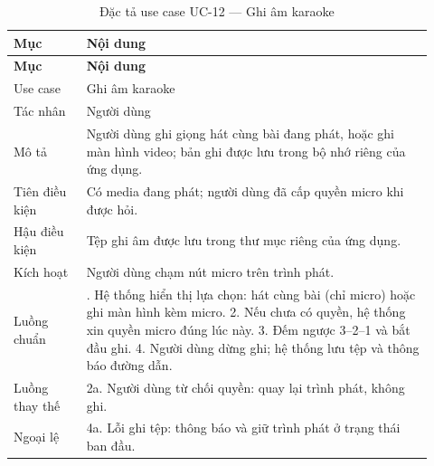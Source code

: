 \begingroup\small\renewcommand{\arraystretch}{1.15}\setlength{\tabcolsep}{3pt}
\begin{longtable}{>{\RaggedRight\arraybackslash}p{0.16\linewidth}>{\RaggedRight\arraybackslash}p{0.76\linewidth}}
\caption{Đặc tả use case UC-12 --- Ghi âm karaoke}
\label{tab:spec-uc-12}\\
\toprule
\textbf{Mục} & \textbf{Nội dung} \\
\midrule
\endfirsthead
\toprule
\textbf{Mục} & \textbf{Nội dung} \\
\midrule
\endhead
\bottomrule
\endfoot
Use case & Ghi âm karaoke \\
Tác nhân & Người dùng \\
Mô tả & Người dùng ghi giọng hát cùng bài đang phát, hoặc ghi màn hình video; bản ghi được lưu trong bộ nhớ riêng của ứng dụng. \\
Tiên điều kiện & Có media đang phát; người dùng đã cấp quyền micro khi được hỏi. \\
Hậu điều kiện & Tệp ghi âm được lưu trong thư mục riêng của ứng dụng. \\
Kích hoạt & Người dùng chạm nút micro trên trình phát. \\
Luồng chuẩn & 1. Hệ thống hiển thị lựa chọn: hát cùng bài (chỉ micro) hoặc ghi màn hình kèm micro. 2. Nếu chưa có quyền, hệ thống xin quyền micro đúng lúc này. 3. Đếm ngược 3--2--1 và bắt đầu ghi. 4. Người dùng dừng ghi; hệ thống lưu tệp và thông báo đường dẫn. \\
Luồng thay thế & 2a. Người dùng từ chối quyền: quay lại trình phát, không ghi. \\
Ngoại lệ & 4a. Lỗi ghi tệp: thông báo và giữ trình phát ở trạng thái ban đầu. \\
\end{longtable}
\endgroup

